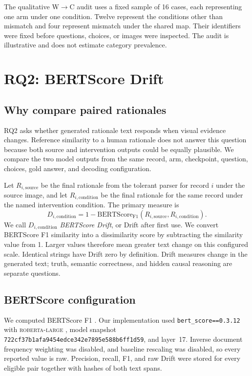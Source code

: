 The qualitative W$\rightarrow$C audit uses a fixed sample of 16 cases, each
representing one arm under one condition. Twelve represent the conditions other than mismatch and four represent
mismatch under the shared map. Their identifiers were fixed before questions,
choices, or images were inspected. The audit is illustrative and does not estimate category
prevalence.

\section{RQ2: BERTScore Drift}
\label{sec:framework-rq2}

\subsection{Why compare paired rationales}
\label{sec:framework-drift-motivation}

RQ2 asks whether generated rationale text responds when visual evidence changes.
Reference similarity to a human rationale does not answer this question because
both source and intervention outputs could be equally plausible. We compare the
two model outputs from the same record, arm, checkpoint, question, choices, gold
answer, and decoding configuration.

Let $R_{i,\mathrm{source}}$ be the final rationale from the tolerant parser for
record $i$ under the source image, and let $R_{i,\mathrm{condition}}$ be the
final rationale for the same record under the named intervention condition. The
primary measure is
\[
  D_{i,\mathrm{condition}}
  =1-\mathrm{BERTScore}_{\mathrm{F1}}
  \left(R_{i,\mathrm{source}},R_{i,\mathrm{condition}}\right).
\]
We call $D_{i,\mathrm{condition}}$ \emph{BERTScore Drift}, or Drift after first
use. We convert BERTScore F1 similarity into a dissimilarity score by
subtracting the similarity value from 1. Larger values therefore mean greater
text change on this configured scale. Identical strings have Drift zero by
definition. Drift measures change in the generated text; truth, semantic
correctness, and hidden causal reasoning are separate questions.

\subsection{BERTScore configuration}
\label{sec:framework-bertscore-config}

We computed BERTScore F1 \citep{DBLP:conf/iclr/ZhangKWWA20}. Our implementation
used \texttt{bert\_score==0.3.12} with \textsc{roberta-large}
\citep{DBLP:journals/corr/abs-1907-11692}, model snapshot
\texttt{722cf37b1afa9454edce342e7895e588b6ff1d59}, and layer~17.
Inverse document frequency weighting was
disabled, and baseline rescaling was disabled, so every reported value is raw.
Precision, recall, F1, and raw Drift were stored for every eligible pair
together with hashes of both text spans.

